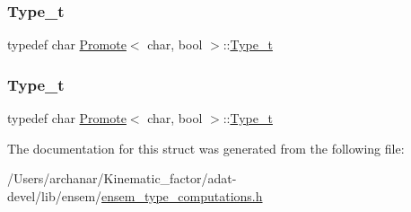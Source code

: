\subsubsection{\texorpdfstring{Type\_t}{Type\_t}\hspace{0.1cm}{\footnotesize\ttfamily [2/3]}}
{\footnotesize\ttfamily typedef char \mbox{\hyperlink{structPromote}{Promote}}$<$ char, bool $>$\+::\mbox{\hyperlink{structPromote_3_01char_00_01bool_01_4_a8b53bc79ca8fc3ead19479e121877c8f}{Type\+\_\+t}}}

\mbox{\label{structPromote_3_01char_00_01bool_01_4_a8b53bc79ca8fc3ead19479e121877c8f}} 
\subsubsection{\texorpdfstring{Type\_t}{Type\_t}\hspace{0.1cm}{\footnotesize\ttfamily [3/3]}}
{\footnotesize\ttfamily typedef char \mbox{\hyperlink{structPromote}{Promote}}$<$ char, bool $>$\+::\mbox{\hyperlink{structPromote_3_01char_00_01bool_01_4_a8b53bc79ca8fc3ead19479e121877c8f}{Type\+\_\+t}}}



The documentation for this struct was generated from the following file\+:\begin{DoxyCompactItemize}
\item 
/\+Users/archanar/\+Kinematic\+\_\+factor/adat-\/devel/lib/ensem/\mbox{\hyperlink{adat-devel_2lib_2ensem_2ensem__type__computations_8h}{ensem\+\_\+type\+\_\+computations.\+h}}\end{DoxyCompactItemize}
